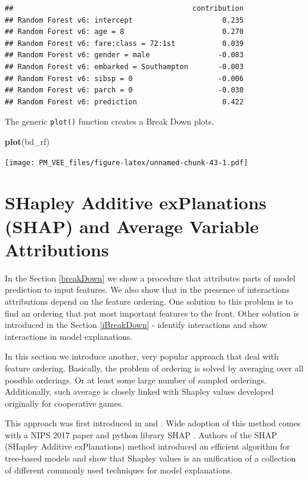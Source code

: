 \documentclass[12pt,]{krantz}
\newenvironment{Shaded}{\begin{snugshade}}{\end{snugshade}}
\newcommand{\KeywordTok}[1]{\textcolor[rgb]{0.13,0.29,0.53}{\textbf{#1}}}
\newcommand{\NormalTok}[1]{#1}
\theoremstyle{definition}
\theoremstyle{definition}
\theoremstyle{definition}
\theoremstyle{remark}
\begin{document}
\begin{verbatim}
##                                          contribution
## Random Forest v6: intercept                     0.235
## Random Forest v6: age = 8                       0.270
## Random Forest v6: fare:class = 72:1st           0.039
## Random Forest v6: gender = male                -0.083
## Random Forest v6: embarked = Southampton       -0.003
## Random Forest v6: sibsp = 0                    -0.006
## Random Forest v6: parch = 0                    -0.030
## Random Forest v6: prediction                    0.422
\end{verbatim}

The generic \texttt{plot()} function creates a Break Down plots.

\begin{Shaded}
\begin{Highlighting}[]
\KeywordTok{plot}\NormalTok{(bd_rf) }
\end{Highlighting}
\end{Shaded}

\texttt{[image: PM\_VEE\_files/figure-latex/unnamed-chunk-43-1.pdf]}

\hypertarget{shapley}{%
\section{SHapley Additive exPlanations (SHAP) and Average Variable
Attributions}\label{shapley}}

In the Section \ref{breakDown} we show a procedure that attributes parts
of model prediction to input features. We also show that in the presence
of interactions attributions depend on the feature ordering. One
solution to this problem is to find an ordering that put most important
features to the front. Other solution is introduced in the Section
\ref{iBreakDown} - identify interactions and show interactions in model
explanations.

In this section we introduce another, very popular approach that deal
with feature ordering. Basically, the problem of ordering is solved by
averaging over all possible orderings. Or at least some large number of
sampled orderings. Additionally, such average is closely linked with
Shapley values developed originally for cooperative games.

This approach was first introduced in \citep{imeJLMR} and
\citep{Strumbelj2014}. Wide adoption of this method comes with a NIPS
2017 paper \citep{SHAP} and python library SHAP \citep{shapPackage}.
Authors of the SHAP (SHapley Additive exPlanations) method introduced an
efficient algorithm for tree-based models \citep{TreeSHAP} and show that
Shapley values is an unification of a collection of different commonly
used techniques for model explanations.
\end{document}
